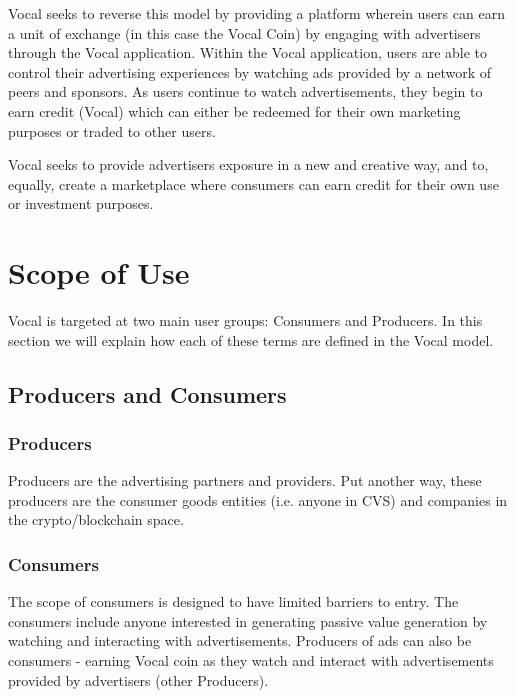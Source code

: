 \documentclass[conference]{IEEEtran}
\begin{document}
   Vocal seeks to reverse this model by providing a platform wherein users can earn a unit of exchange (in this case the Vocal Coin) by engaging with advertisers through the Vocal application. Within the Vocal application, users are able to control their advertising experiences by watching ads provided by a network of peers and sponsors. As users continue to watch advertisements, they begin to earn credit (Vocal) which can either be redeemed for their own marketing purposes or traded to other users. 

   Vocal seeks to provide advertisers exposure in a new and creative way, and to, equally, create a marketplace where consumers can earn credit for their own use or investment purposes.

    \section{Scope of Use}

   Vocal is targeted at two main user groups: Consumers and Producers. In this section we will explain how each of these terms are defined in the Vocal model.

    \subsection{Producers and Consumers}

    \subsubsection{Producers} Producers are the advertising partners and providers. Put another way, these producers are the consumer goods entities (i.e. anyone in CVS) and companies in the crypto/blockchain space.

    \subsubsection{Consumers} The scope of consumers is designed to have limited barriers to entry. The consumers include anyone interested in generating passive value generation by watching and interacting with advertisements. Producers of ads can also be consumers - earning Vocal coin as they watch and interact with advertisements provided by advertisers (other Producers).

\end{document}

